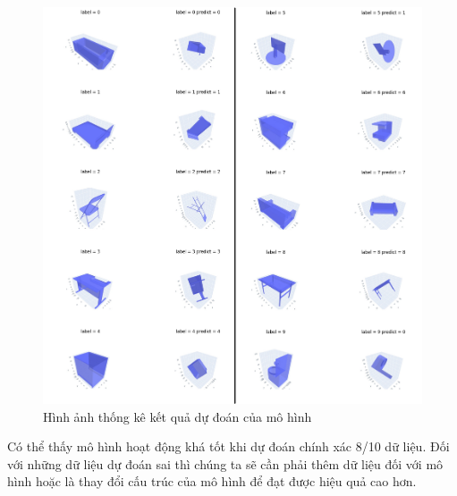 \begin{figure}[H]
    \centering
    \includegraphics[width=1\linewidth]{Images/TFN/result.png}
    \caption{Hình ảnh thống kê kết quả dự đoán của mô hình}
    \label{fig:equi_re}
\end{figure}

Có thể thấy mô hình hoạt động khá tốt khi dự đoán chính xác 8/10 dữ liệu. Đối với những dữ liệu dự đoán sai thì chúng ta sẽ cần phải thêm dữ liệu đối với mô hình hoặc là thay đổi cấu trúc của mô hình để đạt được hiệu quả cao hơn.